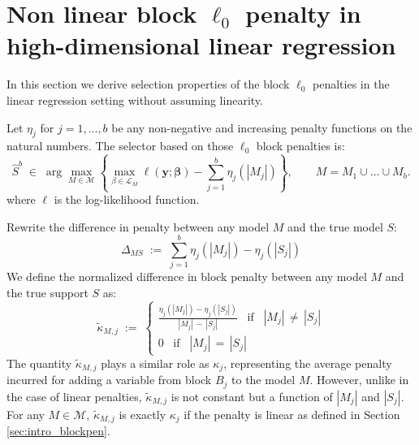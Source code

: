 \documentclass[aos]{imsart}
\theoremstyle{plain}
\newcommand{\M}{\mathcal{M}}
\newcommand{\bs}{\boldsymbol}
\begin{document}
\section{Non linear block $\ell_0$ penalty in high-dimensional linear regression}\label{sec:appendixnonlinear}

In this section we derive selection properties of the block $\ell_0$ penalties in the linear regression setting without assuming linearity. 

Let $\eta_j$ for $j=1,\ldots,b$ be any non-negative and increasing penalty functions on the natural numbers. The selector based on those $\ell_0$ block penalties is:
\begin{equation}
  \widehat S^b\;\in\;\arg\max_{M\in \M} \left\{\max_{\beta\in \mathcal{L}_M} \ell(\bs y;\bs \beta)-\sum_{j=1}^b\eta_j (|M_j|)\right\},\qquad M=M_1\cup \ldots\cup M_b.	
\end{equation}
where $\ell$ is the log-likelihood function.

Rewrite the difference in penalty between any model $M$ and the true model $S$:
\begin{equation}\label{eq:DeltaMbis}
\Delta_{MS} \; := \; \sum_{j=1}^b \eta_j(|M_j|)-\eta_j(|S_j|)
\end{equation}
We define the normalized difference in block penalty between any model $M$ and the true support $S$ as:
 $$\tilde{\kappa}_{M, j}\; := \; \begin{cases}
     \frac{\eta_j(|M_j|)-\eta_j(|S_j|)}{|M_j|\,-\,|S_j|} \;\;\; \text{if}\;\;\; |M_j|\,\neq\,|S_j| \\
     0 \;\;\;\text{if}\;\;\; |M_j|\,=\,|S_j|
 \end{cases}  $$
The quantity $\tilde{\kappa}_{M, j}$ plays a similar role as $\kappa_j$, representing the average penalty incurred for adding a variable from block $B_j$ to the model $M$. However, unlike in the case of linear penalties, $\tilde{\kappa}_{M, j}$ is not constant but a function of $|M_j|$ and $|S_j|$. For any $M\in\M$, $\tilde{\kappa}_{M, j}$ is exactly $\kappa_j$ if the penalty is linear as defined in Section \ref{sec:intro_blockpen}.
\end{document}
